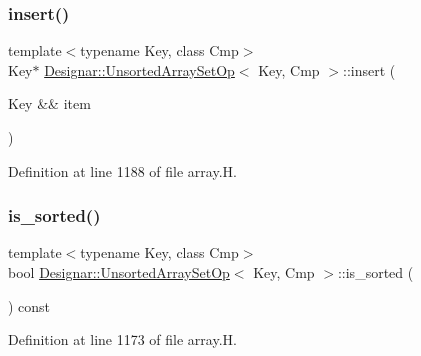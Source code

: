 \subsubsection{\texorpdfstring{insert()}{insert()}\hspace{0.1cm}{\footnotesize\ttfamily [2/2]}}
{\footnotesize\ttfamily template$<$typename Key, class Cmp$>$ \\
Key$\ast$ \hyperlink{class_designar_1_1_unsorted_array_set_op}{Designar\+::\+Unsorted\+Array\+Set\+Op}$<$ Key, Cmp $>$\+::insert (\begin{DoxyParamCaption}\item[{Key \&\&}]{item }\end{DoxyParamCaption})\hspace{0.3cm}{\ttfamily [inline]}}



Definition at line 1188 of file array.\+H.

\mbox{\label{class_designar_1_1_unsorted_array_set_op_afc0e1e303afc39e67727d985a0eb122e}} 
\subsubsection{\texorpdfstring{is\+\_\+sorted()}{is\_sorted()}}
{\footnotesize\ttfamily template$<$typename Key, class Cmp$>$ \\
bool \hyperlink{class_designar_1_1_unsorted_array_set_op}{Designar\+::\+Unsorted\+Array\+Set\+Op}$<$ Key, Cmp $>$\+::is\+\_\+sorted (\begin{DoxyParamCaption}{ }\end{DoxyParamCaption}) const\hspace{0.3cm}{\ttfamily [inline]}}



Definition at line 1173 of file array.\+H.

\mbox{\label{class_designar_1_1_unsorted_array_set_op_aed07acdf2c6e94cbe1392e78f9484c2a}} 
